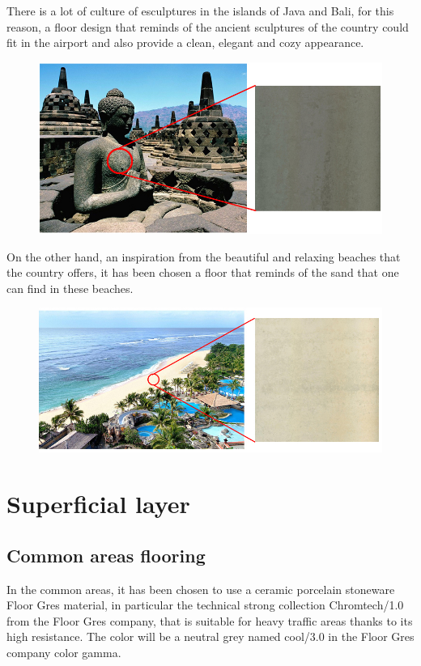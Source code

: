 	There is a lot of culture of esculptures in the islands of Java and Bali, for this reason, a floor design that reminds of the ancient sculptures of the country could fit in the airport and also provide a clean, elegant and cozy appearance.
	
	\begin{figure}[H]
	\centering
\includegraphics[width=13cm]{./images/SueloGeneral}
\end{figure}

On the other hand, an inspiration from the beautiful and relaxing beaches that the country offers, it has been chosen a floor that reminds of the sand that one can find in these beaches.

\begin{figure}[H]
	\centering
\includegraphics[width=15cm]{./images/SueloSecundario}
\end{figure}

	
	
	
	\section{Superficial layer}
		\subsection{Common areas flooring}
	In the common areas, it has been chosen to use a ceramic porcelain stoneware Floor Gres material, in particular the technical strong collection Chromtech/1.0 from the Floor Gres company, that is suitable for heavy traffic areas thanks to its high resistance. The color will be a neutral grey named cool/3.0 in the Floor Gres company color gamma.
	

